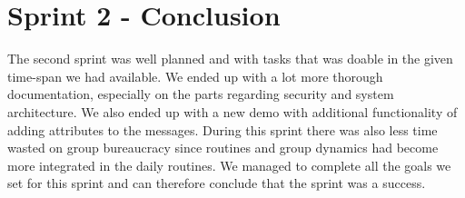 \section{Sprint 2 - Conclusion}
The second sprint was well planned and with tasks that was doable in the given time-span we had available. We ended up with a lot more thorough documentation, especially on the parts regarding security and system architecture. We also ended up with a new demo with additional functionality of adding attributes to the messages. During this sprint there was also less time wasted on group bureaucracy since routines and group dynamics had become more integrated in the daily routines. We managed to complete all the goals we set for this sprint and can therefore conclude that the sprint was a success.     